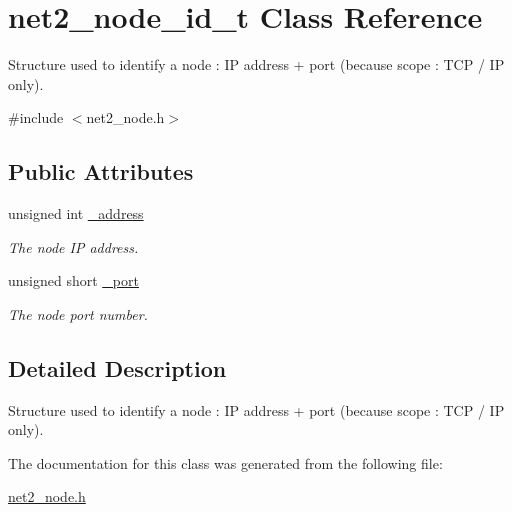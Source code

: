 \hypertarget{structnet2__node__id__t}{\section{net2\-\_\-node\-\_\-id\-\_\-t Class Reference}
\label{structnet2__node__id__t}
}


Structure used to identify a node \-: I\-P address + port (because scope \-: T\-C\-P / I\-P only).  




{\ttfamily \#include $<$net2\-\_\-node.\-h$>$}

\subsection*{Public Attributes}
\begin{DoxyCompactItemize}
\item 
\hypertarget{structnet2__node__id__t_a99c44d35c43abc24127fcee951ae1283}{unsigned int \hyperlink{structnet2__node__id__t_a99c44d35c43abc24127fcee951ae1283}{\-\_\-address}}\label{structnet2__node__id__t_a99c44d35c43abc24127fcee951ae1283}

\begin{DoxyCompactList}\small\item\em The node I\-P address. \end{DoxyCompactList}\item 
\hypertarget{structnet2__node__id__t_a3e5d37dee3738ed77b761c86479f5d23}{unsigned short \hyperlink{structnet2__node__id__t_a3e5d37dee3738ed77b761c86479f5d23}{\-\_\-port}}\label{structnet2__node__id__t_a3e5d37dee3738ed77b761c86479f5d23}

\begin{DoxyCompactList}\small\item\em The node port number. \end{DoxyCompactList}\end{DoxyCompactItemize}


\subsection{Detailed Description}
Structure used to identify a node \-: I\-P address + port (because scope \-: T\-C\-P / I\-P only). 

The documentation for this class was generated from the following file\-:\begin{DoxyCompactItemize}
\item 
\hyperlink{net2__node_8h}{net2\-\_\-node.\-h}\end{DoxyCompactItemize}
